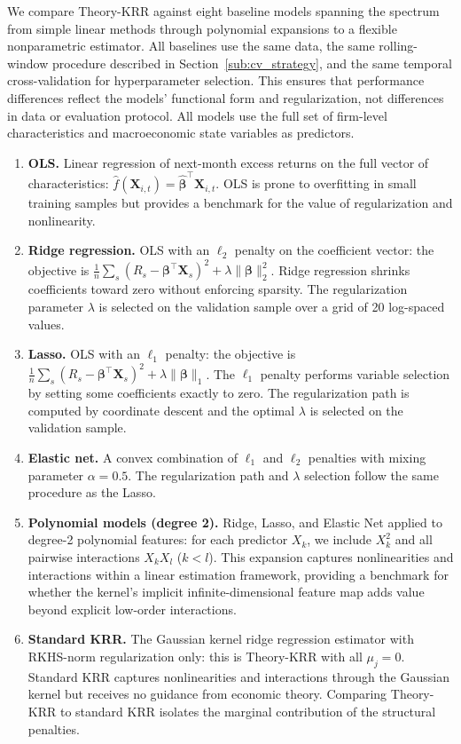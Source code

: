 We compare Theory-KRR against eight baseline models spanning the spectrum from simple linear methods through polynomial expansions to a flexible nonparametric estimator.
All baselines use the same data, the same rolling-window procedure described in Section~\ref{sub:cv_strategy}, and the same temporal cross-validation for hyperparameter selection.
This ensures that performance differences reflect the models' functional form and regularization, not differences in data or evaluation protocol.
All models use the full set of firm-level characteristics and macroeconomic state variables as predictors.

\begin{enumerate}[label=\arabic*.]
\item \textbf{OLS.}
Linear regression of next-month excess returns on the full vector of characteristics: $\hat{f}(\mathbf{X}_{i,t}) = \hat{\bm{\beta}}^{\top}\mathbf{X}_{i,t}$.
OLS is prone to overfitting in small training samples but provides a benchmark for the value of regularization and nonlinearity.

\item \textbf{Ridge regression.}
OLS with an $\ell_2$ penalty on the coefficient vector: the objective is $\frac{1}{n}\sum_s(R_s - \bm{\beta}^\top \mathbf{X}_s)^2 + \lambda\|\bm{\beta}\|_2^2$.
Ridge regression shrinks coefficients toward zero without enforcing sparsity.
The regularization parameter $\lambda$ is selected on the validation sample over a grid of 20 log-spaced values.

\item \textbf{Lasso.}
OLS with an $\ell_1$ penalty: the objective is $\frac{1}{n}\sum_s(R_s - \bm{\beta}^\top \mathbf{X}_s)^2 + \lambda\|\bm{\beta}\|_1$.
The $\ell_1$ penalty performs variable selection by setting some coefficients exactly to zero.
The regularization path is computed by coordinate descent \citep{friedman2010regularization} and the optimal $\lambda$ is selected on the validation sample.

\item \textbf{Elastic net.}
A convex combination of $\ell_1$ and $\ell_2$ penalties with mixing parameter $\alpha = 0.5$.
The regularization path and $\lambda$ selection follow the same procedure as the Lasso.

\item \textbf{Polynomial models (degree 2).}
Ridge, Lasso, and Elastic Net applied to degree-2 polynomial features: for each predictor $X_k$, we include $X_k^2$ and all pairwise interactions $X_k X_l$ ($k < l$).
This expansion captures nonlinearities and interactions within a linear estimation framework, providing a benchmark for whether the kernel's implicit infinite-dimensional feature map adds value beyond explicit low-order interactions.

\item \textbf{Standard KRR.}
The Gaussian kernel ridge regression estimator with RKHS-norm regularization only: this is Theory-KRR with all $\mu_j = 0$.
Standard KRR captures nonlinearities and interactions through the Gaussian kernel but receives no guidance from economic theory.
Comparing Theory-KRR to standard KRR isolates the marginal contribution of the structural penalties.
\end{enumerate}

